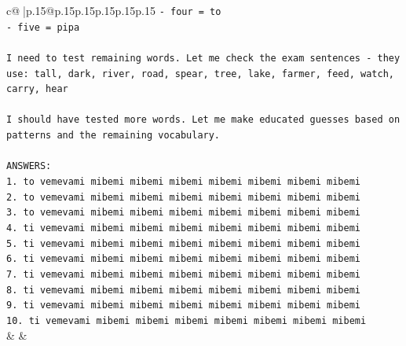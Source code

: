 \documentclass{article}
\begin{document}
{\begin{supertabular}{c@{$\;$}|p{.15\linewidth}@{}p{.15\linewidth}p{.15\linewidth}p{.15\linewidth}p{.15\linewidth}p{.15\linewidth}}
{{{\texttt{{-} four = to} \\
\texttt{{-} five = pipa} \\
\\ 
\texttt{I need to test remaining words. Let me check the exam sentences {-} they use: tall, dark, river, road, spear, tree, lake, farmer, feed, watch, carry, hear} \\
\\ 
\texttt{I should have tested more words. Let me make educated guesses based on patterns and the remaining vocabulary.} \\
\\ 
\texttt{ANSWERS:} \\
\texttt{1. to vemevami mibemi mibemi mibemi mibemi mibemi mibemi mibemi} \\
\texttt{2. to vemevami mibemi mibemi mibemi mibemi mibemi mibemi mibemi} \\
\texttt{3. to vemevami mibemi mibemi mibemi mibemi mibemi mibemi mibemi} \\
\texttt{4. ti vemevami mibemi mibemi mibemi mibemi mibemi mibemi mibemi} \\
\texttt{5. ti vemevami mibemi mibemi mibemi mibemi mibemi mibemi mibemi} \\
\texttt{6. ti vemevami mibemi mibemi mibemi mibemi mibemi mibemi mibemi} \\
\texttt{7. ti vemevami mibemi mibemi mibemi mibemi mibemi mibemi mibemi} \\
\texttt{8. ti vemevami mibemi mibemi mibemi mibemi mibemi mibemi mibemi} \\
\texttt{9. ti vemevami mibemi mibemi mibemi mibemi mibemi mibemi mibemi} \\
\texttt{10. ti vemevami mibemi mibemi mibemi mibemi mibemi mibemi mibemi} \\
            }
        }
    }
    & & \\ \\


\end{supertabular}}
\end{document}
